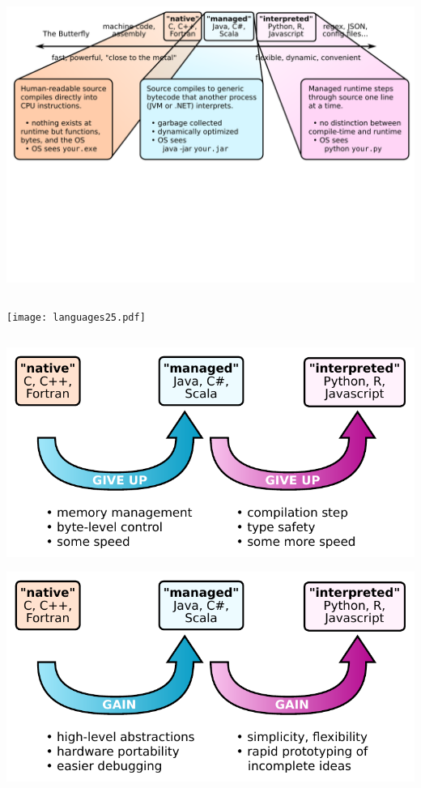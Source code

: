 \documentclass{beamer}
\begin{document}
\begin{frame}{}
\begin{columns}
\includegraphics[width=\linewidth]{languages2.pdf}
\end{columns}
\end{frame}

\begin{frame}{}
\begin{columns}
\texttt{[image: languages25.pdf]}
\end{columns}
\end{frame}

\begin{frame}{}
\begin{center}
\includegraphics[width=0.8\linewidth]{languages3.pdf}
\end{center}
\end{frame}

\begin{frame}{}
\begin{center}
\includegraphics[width=0.8\linewidth]{languages4.pdf}
\end{center}
\end{frame}
\end{document}
